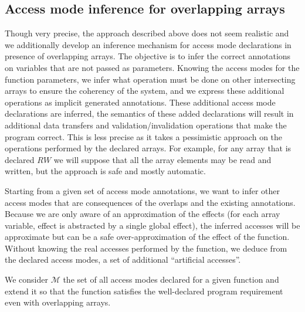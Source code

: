 \documentclass[preprint,12pt]{elsarticle}
\newcommand{\AM}{\mathcal{M}}
\begin{document}
%



\subsection{Access mode inference for overlapping arrays}\label{sec:infer-overlap}

Though very precise, the approach described above does not seem realistic and we additionally develop an inference mechanism for access mode declarations in presence of overlapping arrays.
The objective  is to infer the correct annotations on  variables that are not passed as parameters. Knowing the access modes for the function parameters, we infer what operation must be done on other intersecting arrays to ensure the coherency of the system, and we express these additional operations as implicit generated annotations. These additional access mode declarations are inferred, the semantics of these added declarations will result in additional data transfers and validation/invalidation operations that make the program correct. This is less precise as it takes a pessimistic approach on the operations performed by the declared arrays. For example, for any array that is declared $RW$ we will suppose that all the array elements may be read and written, but the approach is safe and mostly automatic.

Starting from a given set of access mode annotations, we want to infer other access modes that are consequences of the overlaps and the existing annotations.
Because we are only aware of an approximation of the effects (for each array variable, effect is abstracted by a single global effect), the inferred accesses will be approximate but can be a safe over-approximation of the effect of the function.
 Without knowing the real accesses performed by the function, we deduce from the declared access modes, a set of additional ``artificial accesses''.

We consider $\AM$ the set of all access modes declared for a given function and extend it so that the function satisfies the well-declared program requirement even with overlapping arrays.
\end{document}
